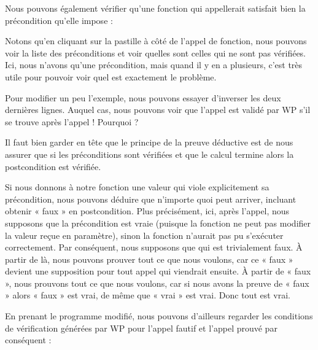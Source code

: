 Nous pouvons également vérifier qu'une fonction qui appellerait 
satisfait bien la précondition qu'elle impose :







Notons qu'en cliquant sur la pastille à côté de l'appel de fonction, nous
pouvons voir la liste des préconditions et voir quelles sont celles qui ne sont
pas vérifiées. Ici, nous n'avons qu'une précondition, mais quand il y en a
plusieurs, c'est très utile pour pouvoir voir quel est exactement le problème.




Pour modifier un peu l'exemple, nous pouvons essayer d'inverser les deux
dernières lignes. Auquel cas, nous pouvons voir que l'appel 
est validé par WP s'il se trouve après l'appel  !
Pourquoi ?



Il faut bien garder en tête que le principe de la preuve déductive est de nous
assurer que si les préconditions sont vérifiées et que le calcul termine alors
la postcondition est vérifiée.


Si nous donnons à notre fonction une valeur qui viole explicitement sa
précondition, nous pouvons déduire que n'importe quoi peut arriver, incluant
obtenir « faux » en postcondition. Plus précisément, ici, après l'appel, nous
supposons que la précondition est vraie (puisque la fonction ne peut pas
modifier la valeur reçue en paramètre), sinon la fonction n'aurait pas pu
s'exécuter correctement. Par conséquent, nous supposons que
 qui est trivialement faux. À partir de là,
nous pouvons  prouver tout ce que nous voulons, car ce « faux » devient une
supposition pour tout appel qui viendrait ensuite. À partir de « faux », nous
prouvons tout ce que
nous voulons, car si nous avons la preuve de « faux » alors « faux » est vrai,
de même que « vrai » est vrai. Donc tout est vrai.



En prenant le programme modifié, nous pouvons d'ailleurs regarder les conditions
de vérification générées par WP pour l'appel fautif et l'appel prouvé par
conséquent :







